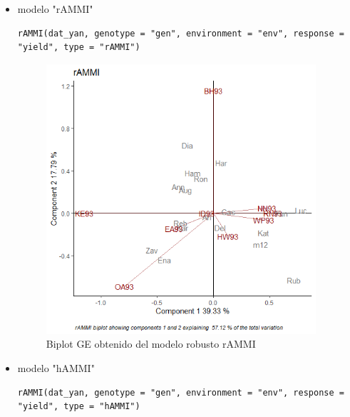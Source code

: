 \begin{itemize}

\item  modelo "rAMMI"

\begin{lstlisting}
rAMMI(dat_yan, genotype = "gen", environment = "env", response = "yield", type = "rAMMI")
\end{lstlisting}

\begin{figure}[H]
	\begin{center}
		\includegraphics[width=10cm]{./Graficos/rAMMI.png}
	\end{center}
	\caption{Biplot GE obtenido del modelo robusto rAMMI}
\end{figure}


\item  modelo "hAMMI"

\begin{lstlisting}
rAMMI(dat_yan, genotype = "gen", environment = "env", response = "yield", type = "hAMMI")
\end{lstlisting}


\end{itemize}
